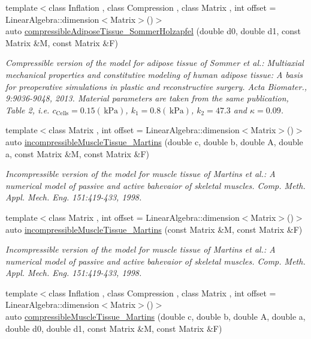 \begin{DoxyCompactItemize}
{\footnotesize template$<$class Inflation , class Compression , class Matrix , int offset = Linear\-Algebra\-::dimension$<$\-Matrix$>$()$>$ }\\auto \hyperlink{group__Biomechanics_ga27bb3f7c579ce8c21a69ea4d4d0169d7}{compressible\-Adipose\-Tissue\-\_\-\-Sommer\-Holzapfel} (double d0, double d1, const Matrix \&M, const Matrix \&F)
\begin{DoxyCompactList}\small\item\em Compressible version of the model for adipose tissue of Sommer et al.\-: Multiaxial mechanical properties and constitutive modeling of human adipose tissue\-: A basis for preoperative simulations in plastic and reconstructive surgery. Acta Biomater., 9\-:9036-\/9048, 2013. Material parameters are taken from the same publication, Table 2, i.\-e. $c_\mathrm{Cells}=0.15 (\,\mathrm{kPa})$, $k_1=0.8 (\,\mathrm{kPa})$, $k_2=47.3$ and $\kappa=0.09$. \end{DoxyCompactList}\item 
{\footnotesize template$<$class Matrix , int offset = Linear\-Algebra\-::dimension$<$\-Matrix$>$()$>$ }\\auto \hyperlink{group__Biomechanics_gafcc36a1958899ca9246c4c1b3c9bfd85}{incompressible\-Muscle\-Tissue\-\_\-\-Martins} (double c, double b, double A, double a, const Matrix \&M, const Matrix \&F)
\begin{DoxyCompactList}\small\item\em Incompressible version of the model for muscle tissue of Martins et al.\-: A numerical model of passive and active bahevaior of skeletal muscles. Comp. Meth. Appl. Mech. Eng. 151\-:419-\/433, 1998. \end{DoxyCompactList}\item 
{\footnotesize template$<$class Matrix , int offset = Linear\-Algebra\-::dimension$<$\-Matrix$>$()$>$ }\\auto \hyperlink{group__Biomechanics_ga9e414585a90b1988e9fa88d17d875055}{incompressible\-Muscle\-Tissue\-\_\-\-Martins} (const Matrix \&M, const Matrix \&F)
\begin{DoxyCompactList}\small\item\em Incompressible version of the model for muscle tissue of Martins et al.\-: A numerical model of passive and active bahevaior of skeletal muscles. Comp. Meth. Appl. Mech. Eng. 151\-:419-\/433, 1998. \end{DoxyCompactList}\item 
{\footnotesize template$<$class Inflation , class Compression , class Matrix , int offset = Linear\-Algebra\-::dimension$<$\-Matrix$>$()$>$ }\\auto \hyperlink{group__Biomechanics_gad831914c493a3da04ed40c3c0ce87a62}{compressible\-Muscle\-Tissue\-\_\-\-Martins} (double c, double b, double A, double a, double d0, double d1, const Matrix \&M, const Matrix \&F)

\end{DoxyCompactItemize}
